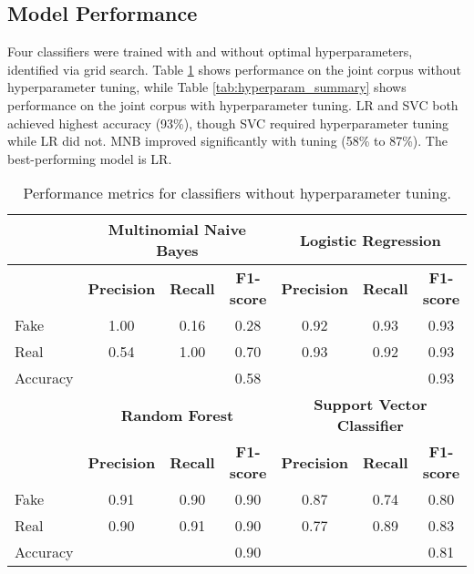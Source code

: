 \documentclass[conference]{IEEEtran}
\begin{document}
\subsection{Model Performance}
Four classifiers were trained with and without optimal hyperparameters, identified via grid search. Table \ref{tab:no_hyperparam_summary} shows performance on the joint corpus without hyperparameter tuning, while Table \ref{tab:hyperparam_summary} shows performance on the joint corpus with hyperparameter tuning. LR and SVC both achieved highest accuracy (93\%), though SVC required hyperparameter tuning while LR did not. MNB improved significantly with tuning (58\% to 87\%). The best-performing model is LR.

\begin{table}[!t]
\caption{Performance metrics for classifiers without hyperparameter tuning.}
\label{tab:no_hyperparam_summary}
\begin{center}
\begin{tabular}{|l|ccc|ccc|}
\hline
& \multicolumn{3}{c|}{\textbf{Multinomial Naive Bayes}} & \multicolumn{3}{c|}{\textbf{Logistic Regression}} \\
\hline
& \textbf{Precision} & \textbf{Recall} & \textbf{F1-score} & \textbf{Precision} & \textbf{Recall} & \textbf{F1-score} \\
\hline
Fake & 1.00 & 0.16 & 0.28 & 0.92 & 0.93 & 0.93 \\
Real & 0.54 & 1.00 & 0.70 & 0.93 & 0.92 & 0.93 \\
Accuracy & & & 0.58 & & & 0.93 \\
\hline
& \multicolumn{3}{c|}{\textbf{Random Forest}} & \multicolumn{3}{c|}{\textbf{Support Vector Classifier}} \\
\hline
& \textbf{Precision} & \textbf{Recall} & \textbf{F1-score} & \textbf{Precision} & \textbf{Recall} & \textbf{F1-score} \\
\hline
Fake & 0.91 & 0.90 & 0.90 & 0.87 & 0.74 & 0.80 \\
Real & 0.90 & 0.91 & 0.90 & 0.77 & 0.89 & 0.83 \\
Accuracy & & & 0.90 & & & 0.81 \\
\hline
\end{tabular}
\end{center}
\end{table}
\end{document}

